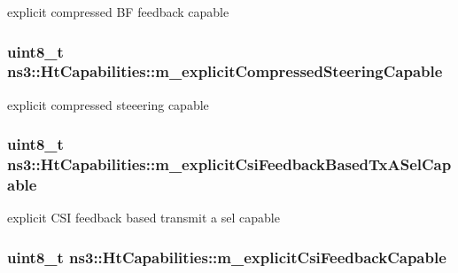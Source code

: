 explicit compressed BF feedback capable 

\subsubsection[{\texorpdfstring{m\+\_\+explicit\+Compressed\+Steering\+Capable}{m_explicitCompressedSteeringCapable}}]{\setlength{\rightskip}{0pt plus 5cm}uint8\+\_\+t ns3\+::\+Ht\+Capabilities\+::m\+\_\+explicit\+Compressed\+Steering\+Capable\hspace{0.3cm}{\ttfamily [private]}}\hypertarget{classns3_1_1HtCapabilities_af8798433f1b66b1d04eb752d362b7fbf}{}\label{classns3_1_1HtCapabilities_af8798433f1b66b1d04eb752d362b7fbf}


explicit compressed steeering capable 

\subsubsection[{\texorpdfstring{m\+\_\+explicit\+Csi\+Feedback\+Based\+Tx\+A\+Sel\+Capable}{m_explicitCsiFeedbackBasedTxASelCapable}}]{\setlength{\rightskip}{0pt plus 5cm}uint8\+\_\+t ns3\+::\+Ht\+Capabilities\+::m\+\_\+explicit\+Csi\+Feedback\+Based\+Tx\+A\+Sel\+Capable\hspace{0.3cm}{\ttfamily [private]}}\hypertarget{classns3_1_1HtCapabilities_aefb68d446386993483837d8a19c0b0c9}{}\label{classns3_1_1HtCapabilities_aefb68d446386993483837d8a19c0b0c9}


explicit C\+SI feedback based transmit a sel capable 

\subsubsection[{\texorpdfstring{m\+\_\+explicit\+Csi\+Feedback\+Capable}{m_explicitCsiFeedbackCapable}}]{\setlength{\rightskip}{0pt plus 5cm}uint8\+\_\+t ns3\+::\+Ht\+Capabilities\+::m\+\_\+explicit\+Csi\+Feedback\+Capable\hspace{0.3cm}{\ttfamily [private]}}\hypertarget{classns3_1_1HtCapabilities_a8b43df792adaaaf96c9234a9fe9ab0a2}{}\label{classns3_1_1HtCapabilities_a8b43df792adaaaf96c9234a9fe9ab0a2}


